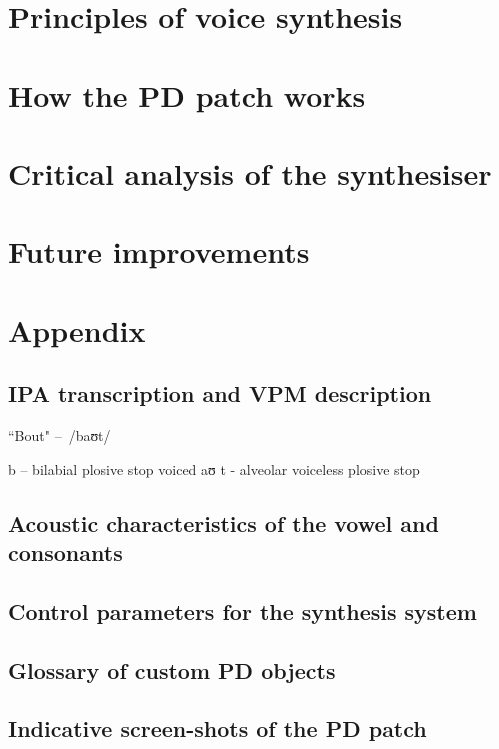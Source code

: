 



	
	\begin{multicols}{2}
	
		\section{Principles of voice synthesis}
		
		
		\section{How the PD patch works}
		
		
		\section{Critical analysis of the synthesiser}
		
		
		\section{Future improvements}
		
		
	\end{multicols}
	
	\pagebreak
	
	\appendix
	\section{Appendix}
	
	\subsection{IPA transcription and VPM description}
	
	``Bout" – /baʊt/
	
	b  – bilabial plosive stop voiced
	aʊ
	t - alveolar voiceless plosive stop
	
	\subsection{Acoustic characteristics of the vowel and consonants}
	
	\subsection{Control parameters for the synthesis system}
	\subsection{Glossary of custom PD objects}
	
	\subsection{Indicative screen-shots of the PD patch}
	
	
	


